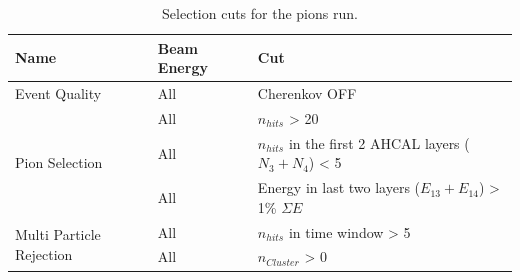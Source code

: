 \documentclass{JINST}
\begin{document}
\begin{table}[htb!]
  \centering
  \caption{Selection cuts for the pions run.}
  \label{table:pion_sel}
  \begin{tabular}{@{}lll@{}}
    \toprule
    \multicolumn{1}{l}{\textbf{Name}} & \textbf{Beam Energy} & \textbf{Cut}\\
    \midrule
    \multirow{1}{*}{Event Quality}& All & Cherenkov OFF\\
    \midrule
    \multirow{3}{*}{Pion Selection}& All & $n_{hits}$ > 20 \\& All & $n_{hits}$ in the first 2 AHCAL layers ($N_3 + N_4$) < 5 \\& All & Energy in last two layers ($E_{13} + E_{14}$) > 1\% $\Sigma E$ \\
    \midrule
    \multirow{2}{*}{Multi Particle Rejection}& All & $n_{hits}$ in time window > 5 \\& All & $n_{Cluster}$ > 0 \\
    \bottomrule
  \end{tabular}
\end{table}
\end{document}
